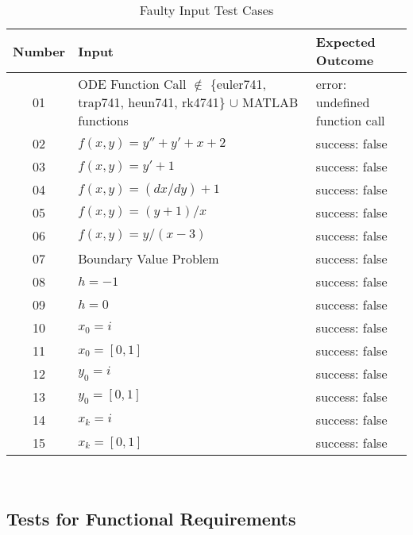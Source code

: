 \documentclass[12pt, titlepage]{article}
\begin{document}
\begin{table} [H]
  \caption{Faulty Input Test Cases}
  \label{Table:Table_FaultyInputs}  
\begin{tabular}{|c|p{8cm}|p{6cm}|}
  \hline	
  \textbf{Number} & \textbf{Input} &\textbf{Expected Outcome}\\
  \hline 
  01 & ODE Function Call $\mathbb{\notin}$ \{euler741, trap741, heun741, rk4741\} $\mathbb{\cup}$ 
  MATLAB functions & error: undefined function call\\ \hline
  02& $f(x, y) = y'' + y' + x + 2$ & success: false\\ \hline
  03& $f(x, y) = y' + 1$ & success: false\\ \hline
  04& $f(x, y) = (dx/dy) + 1$ & success: false\\ \hline
  05& $f(x, y) = (y + 1) / x$ & success: false\\ \hline
  06& $f(x, y) = y/(x-3)$ & success: false\\ \hline
  07& Boundary Value Problem & success: false\\ \hline
  08& $h = -1$ & success: false\\ \hline
  09& $h = 0$ & success: false\\ \hline
  10& $x_0 = i$ & success: false\\ \hline 
  11& $x_0 = [0, 1]$ & success: false\\ \hline 
  12& $y_0 = i$ & success: false\\ \hline 
  13& $y_0 = [0, 1]$ & success: false\\ \hline
  14& $x_k = i$ & success: false\\ \hline 
  15& $x_k = [0, 1]$ & success: false\\ \hline

\end{tabular}\\
\end{table}


\subsection{Tests for Functional Requirements}
\end{document}
